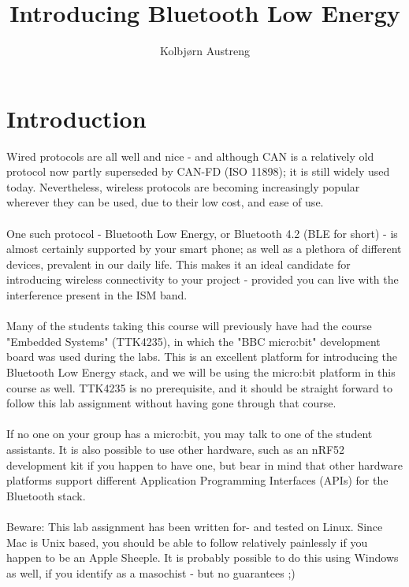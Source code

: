 \documentclass[11pt,a4paper]{article}
\title{Introducing Bluetooth Low Energy}
\author{Kolbjørn Austreng}
\date{}
\begin{document}
\maketitle

\renewcommand{\thesection}{\roman{section}}
\renewcommand{\thesubsection}{\roman{section}.\alph{subsection}}

\section{Introduction}
Wired protocols are all well and nice - and although CAN is a relatively old protocol now partly superseded by CAN-FD (ISO 11898); it is still widely used today. Nevertheless, wireless protocols are becoming increasingly popular wherever they can be used, due to their low cost, and ease of use.\\
\\
One such protocol - Bluetooth Low Energy, or Bluetooth 4.2 (BLE for short) - is almost certainly supported by your smart phone; as well as a plethora of different devices, prevalent in our daily life. This makes it an ideal candidate for introducing wireless connectivity to your project - provided you can live with the interference present in the ISM band.\\
\\
Many of the students taking this course will previously have had the course "Embedded Systems" (TTK4235), in which the "BBC micro:bit" development board was used during the labs. This is an excellent platform for introducing the Bluetooth Low Energy stack, and we will be using the micro:bit platform in this course as well. TTK4235 is no prerequisite, and it should be straight forward to follow this lab assignment without having gone through that course.\\
\\
If no one on your group has a micro:bit, you may talk to one of the student assistants. It is also possible to use other hardware, such as an nRF52 development kit if you happen to have one, but bear in mind that other hardware platforms support different Application Programming Interfaces (APIs) for the Bluetooth stack.\\
\\
Beware: This lab assignment has been written for- and tested on Linux. Since Mac is Unix based, you should be able to follow relatively painlessly if you happen to be an Apple Sheeple. It is probably possible to do this using Windows as well, if you identify as a masochist - but no guarantees ;)
\end{document}
